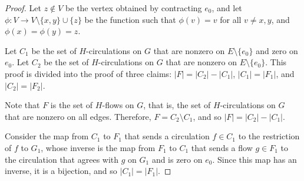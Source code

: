 \begin{proof}
	Let \(z \notin V\) be the vertex obtained by contracting \(e_0\),
	and let \(\phi \colon V \to V \setminus \{x, y\} \cup \{z\}\) be the function such that \(\phi(v) = v\) for all \(v \neq x, y\), and \(\phi(x) = \phi(y) = z\).

	Let \(C_1\) be the set of \(H\)-circulations on \(G\) that are nonzero on \(E \setminus \{e_0\}\) and zero on \(e_0\).
	Let \(C_2\) be the set of \(H\)-circulations on \(G\) that are nonzero on \(E \setminus \{e_0\}\).
	This proof is divided into the proof of three claims:
	\(|F| = |C_2| - |C_1|\),
	\(|C_1| = |F_1|\), and
	\(|C_2| = |F_2|\).

	Note that \(F\) is the set of \(H\)-flows on \(G\), that is, the set of \(H\)-circulations on \(G\) that are nonzero on all edges.
	Therefore, \(F = C_2 \setminus C_1\), and so \(|F| = |C_2| - |C_1|\).

	Consider the map from \(C_1\) to \(F_1\) that sends a circulation \(f \in C_1\) to the restriction of \(f\) to \(G_1\), whose inverse is the map from \(F_1\) to \(C_1\) that sends a flow \(g \in F_1\) to the circulation that agrees with \(g\) on \(G_1\) and is zero on \(e_0\).
	Since this map has an inverse, it is a bijection, and so \(|C_1| = |F_1|\).


\end{proof}
